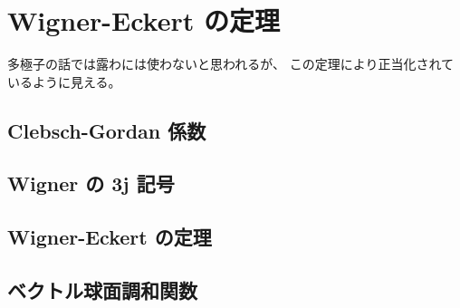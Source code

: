 \documentclass[../../master.tex]{subfiles}
\begin{document}
\chapter{Wigner-Eckert の定理}
多極子の話では露わには使わないと思われるが、
この定理により正当化されているように見える。

\section{Clebsch-Gordan 係数}

\section{Wigner の 3j 記号}

\section{Wigner-Eckert の定理}

\section{ベクトル球面調和関数}
\end{document}
